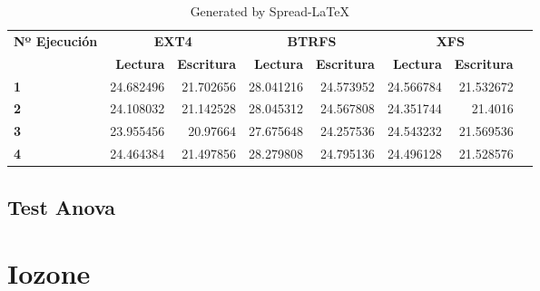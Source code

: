 \begin{table}[!h]\centering
\caption{Generated by Spread-LaTeX}\label{tab: }
\scriptsize
\begin{tabular}{lrrrrrrr}\toprule
\textbf{Nº Ejecución} &\multicolumn{2}{c}{\textbf{EXT4}} &\multicolumn{2}{c}{\textbf{BTRFS}} &\multicolumn{2}{c}{\textbf{XFS}} \\\cmidrule{1-7}
&\textbf{Lectura} &\textbf{Escritura} &\textbf{Lectura} &\textbf{Escritura} &\textbf{Lectura} &\textbf{Escritura} \\\midrule
\textbf{1} &24.682496 &21.702656 &28.041216 &24.573952 &24.566784 &21.532672 \\
\textbf{2} &24.108032 &21.142528 &28.045312 &24.567808 &24.351744 &21.4016 \\
\textbf{3} &23.955456 &20.97664 &27.675648 &24.257536 &24.543232 &21.569536 \\
\textbf{4} &24.464384 &21.497856 &28.279808 &24.795136 &24.496128 &21.528576 \\
\bottomrule
\end{tabular}
\end{table}



\subsection{Test Anova}

\section{Iozone}
